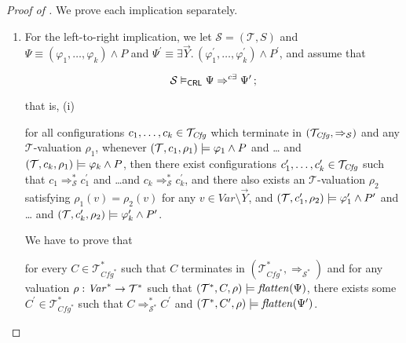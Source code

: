 \begin{proof}[Proof of ]
We prove each implication separately.
\begin{enumerate}
    \item For the left-to-right implication, we
    let $\mathcal{S} = (\mathcal{T}, S)$
    and $\Psi \equiv (\varphi_1,\ldots,\varphi_k) \land P$
    and $\Psi^\prime \equiv \exists \vec{Y}.\, (\varphi_1^\prime,\ldots,\varphi_k^\prime) \land P^\prime$,
    and assume that
    \begin{proofenv}
        \begin{equation*}
            \mathcal{S} \vDash_{\mathsf{CRL}} \Psi \Rightarrow^{c\exists} \Psi^\prime \, ;
        \end{equation*}
    \end{proofenv}
    that is, (i)
    \begin{proofenv}
        for all configurations $c_1,\ldots,c_k \in \mathcal{T}_{\mathit{Cfg}}$
        which terminate in $(\mathcal{T}_{\mathit{Cfg}}, \Rightarrow_{\mathcal{S}})$
        and any $\mathcal{T}$-valuation $\rho_1$,
        whenever $(\mathcal{T}, c_1,\rho_1) \models \varphi_1 \land P$ and \ldots
        and $(\mathcal{T}, c_k,\rho_1) \models \varphi_k \land P$,
        then there exist configurations $c_1^\prime,\ldots,c_k^\prime \in \mathcal{T}_{\mathit{Cfg}}$
        such that $c_1 \Rightarrow^{*}_{\mathcal{S}} c_1^\prime$
        and \ldots and $c_k \Rightarrow^{*}_{\mathcal{S}} c_k^\prime$,
        and there also exists an $\mathcal{T}$-valuation $\rho_2$
        satisfying $\rho_1(v) = \rho_2(v)$ for any $v \in \mathit{Var} \setminus \vec{Y}$,
        and
        $(\mathcal{T}, c_1^\prime,\rho_2) \models \varphi^\prime_1 \land P^\prime$ and \ldots
        and $(\mathcal{T}, c_k^\prime, \rho_2) \models \varphi^\prime_k \land P^\prime$.
    \end{proofenv}
    We have to prove that
    \begin{proofenv}
    for every $C \in \mathcal{T}^*_{\mathit{Cfg}^*}$
    such that $C$ terminates in $(\mathcal{T}^*_{\mathit{Cfg}^*}, \Rightarrow_{\mathcal{S}^*})$
    and for any valuation $\rho : \mathit{Var}^* \to \mathcal{T}^*$
    such that $(\mathcal{T}^*, C, \rho) \models \mathit{flatten}(\Psi)$,
    there exists some $C^\prime \in \mathcal{T}^*_{\mathit{Cfg}^*}$
    such that
    $C \Rightarrow^{*}_{\mathcal{S}^*} C^\prime$
    and $(\mathcal{T}^*, C^\prime, \rho) \models \mathit{flatten}(\Psi^\prime)$.
    \end{proofenv}

\end{enumerate}
\end{proof}
